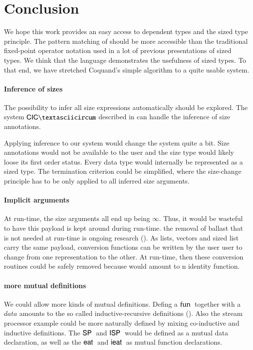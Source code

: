\chapter{Conclusion}
We hope this work provides an easy access to dependent types and the sized type principle.
The pattern matching of \mugda should be more accessible than the traditional fixed-point operator
notation used in a lot of previous presentations of sized types.
We think that the \mugda language demonstrates the usefulness of sized types.
To that end, we have stretched Coquand's simple algorithm to a quite usable system.
\subsubsection{Inference of sizes}
The possibility to infer all size expressions automatically should be explored.
The system $\mathsf{CIC\textasciicircum}$ described in \cite{bgp:lpar06} can handle the inference of size annotations. 

Applying inference to our system would change the system quite a bit.
Size annotations would not be available to the user and the size type would likely loose its first order status. Every data type would internally be represented as a sized type. The termination criterion could be simplified, where the size-change principle has to be only applied to all inferred size arguments.
\subsubsection{Implicit arguments}
At run-time, the size arguments all end up being $\infty$.
Thus, it would be wasteful to have this payload is kept around during run-time. 
the removal of ballast that is not needed at run-time is ongoing research (\cite{miquel01implicit,DBLP:conf/types/BradyMM03}).
As lists, vectors and sized list carry the same payload, conversion functions can be written by the user user to change from one representation to the other. At run-time, then these conversion routines could be safely removed because would amount to n identity function.
\subsubsection{more mutual definitions}
We could allow more kinds of mutual definitions.
Defing a $\mathrm{fun}\:$ together with a $data$ amounts to the so called inductive-recursive definitions (\cite{dybjer01indexed}).
Also the stream processor example could be more naturally defined by mixing co-inductive and inductive definitions.
The $\mathsf{SP}\:$ and $\mathsf{ISP}\:$ would be defined as a mutual data declaration, as well as the $\mathsf{eat}\: $ and $\mathsf{ieat}\:$ as mutual function declarations.

